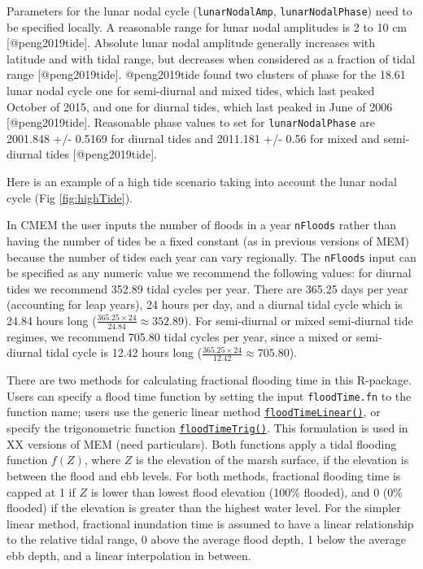 Parameters for the lunar nodal cycle (\texttt{lunarNodalAmp},
\texttt{lunarNodalPhase}) need to be specified locally. A reasonable
range for lunar nodal amplitudes is 2 to 10 cm {[}@peng2019tide{]}.
Absolute lunar nodal amplitude generally increases with latitude and
with tidal range, but decreases when considered as a fraction of tidal
range {[}@peng2019tide{]}. @peng2019tide found two clusters of phase for
the 18.61 lunar nodal cycle one for semi-diurnal and mixed tides, which
last peaked October of 2015, and one for diurnal tides, which last
peaked in June of 2006 {[}@peng2019tide{]}. Reasonable phase values to
set for \texttt{lunarNodalPhase} are 2001.848 +/- 0.5169 for diurnal
tides and 2011.181 +/- 0.56 for mixed and semi-diurnal tides
{[}@peng2019tide{]}.

Here is an example of a high tide scenario taking into account the lunar
nodal cycle (Fig \ref{fig:highTide}).

In CMEM the user inputs the number of floods in a year \texttt{nFloods}
rather than having the number of tides be a fixed constant (as in
previous versions of MEM) because the number of tides each year can vary
regionally. The \texttt{nFloods} input can be specified as any numeric
value we recommend the following values: for diurnal tides we recommend
352.89 tidal cycles per year. There are 365.25 days per year (accounting
for leap years), 24 hours per day, and a diurnal tidal cycle which is
24.84 hours long (\(\frac{365.25 \times 24}{24.84} \approx 352.89\)).
For semi-diurnal or mixed semi-diurnal tide regimes, we recommend 705.80
tidal cycles per year, since a mixed or semi-diurnal tidal cycle is
12.42 hours long (\(\frac{365.25 \times 24}{12.42} \approx 705.80\)).

There are two methods for calculating fractional flooding time in this
R-package. Users can specify a flood time function by setting the input
\texttt{floodTime.fn} to the function name; users use the generic linear
method \protect\hyperlink{floodtimelinear}{\texttt{floodTimeLinear()}},
or specify the trigonometric function
\protect\hyperlink{floodtimetrig}{\texttt{floodTimeTrig()}}. This
formulation is used in XX versions of MEM (need particulars). Both
functions apply a tidal flooding function \(f(Z)\), where \(Z\) is the
elevation of the marsh surface, if the elevation is between the flood
and ebb levels. For both methods, fractional flooding time is capped at
1 if \(Z\) is lower than lowest flood elevation (100\% flooded), and 0
(0\% flooded) if the elevation is greater than the highest water level.
For the simpler linear method, fractional inundation time is assumed to
have a linear relationship to the relative tidal range, 0 above the
average flood depth, 1 below the average ebb depth, and a linear
interpolation in between.


